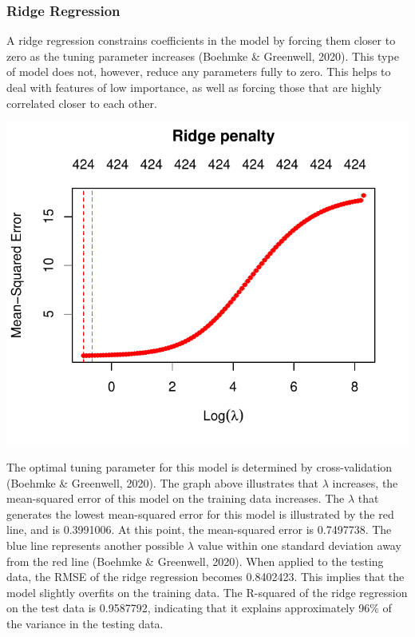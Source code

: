 \documentclass[11pt,preprint, authoryear]{elsarticle}
\numberwithin{equation}{section}
\numberwithin{figure}{section}
\numberwithin{table}{section}
\begin{document}
\hypertarget{ridge-regression}{%
\subsubsection{Ridge Regression}\label{ridge-regression}}

A ridge regression constrains coefficients in the model by forcing them
closer to zero as the tuning parameter increases (Boehmke \& Greenwell,
2020). This type of model does not, however, reduce any parameters fully
to zero. This helps to deal with features of low importance, as well as
forcing those that are highly correlated closer to each other.

\begin{center}\includegraphics{MLPDF_files/figure-latex/unnamed-chunk-10-1} \end{center}

The optimal tuning parameter for this model is determined by
cross-validation (Boehmke \& Greenwell, 2020). The graph above
illustrates that \(\lambda\) increases, the mean-squared error of this
model on the training data increases. The \(\lambda\) that generates the
lowest mean-squared error for this model is illustrated by the red line,
and is 0.3991006. At this point, the mean-squared error is 0.7497738.
The blue line represents another possible \(\lambda\) value within one
standard deviation away from the red line (Boehmke \& Greenwell, 2020).
When applied to the testing data, the RMSE of the ridge regression
becomes 0.8402423. This implies that the model slightly overfits on the
training data. The R-squared of the ridge regression on the test data is
0.9587792, indicating that it explains approximately 96\% of the
variance in the testing data.
\end{document}
